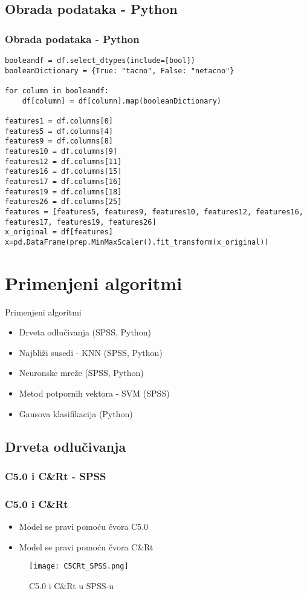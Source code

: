 \documentclass{beamer}
\begin{document}
\subsection*{Obrada podataka - Python}
\begin{frame}[fragile]
\frametitle{Obrada podataka - Python}
\begin{lstlisting}
booleandf = df.select_dtypes(include=[bool])
booleanDictionary = {True: "tacno", False: "netacno"}

for column in booleandf:
    df[column] = df[column].map(booleanDictionary)

features1 = df.columns[0]
features5 = df.columns[4]
features9 = df.columns[8]
features10 = df.columns[9]
features12 = df.columns[11]
features16 = df.columns[15]
features17 = df.columns[16]
features19 = df.columns[18]
features26 = df.columns[25]
features = [features5, features9, features10, features12, features16, features17, features19, features26]
x_original = df[features]
x=pd.DataFrame(prep.MinMaxScaler().fit_transform(x_original))
\end{lstlisting}
\end{frame}

\section{Primenjeni algoritmi}
\begin{frame}{Primenjeni algoritmi}
\begin{itemize}
	\item Drveta odlučivanja (SPSS, Python)
	\item Najbliži susedi - KNN (SPSS, Python)
	\item Neuronske mreže (SPSS, Python)
	\item Metod potpornih vektora - SVM (SPSS)
	\item Gausova klasifikacija (Python)
\end{itemize}
\end{frame}


\subsection{Drveta odlučivanja}
\subsubsection*{C5.0 i C\&Rt - SPSS}
\begin{frame}[fragile]
\frametitle{C5.0 i C\&Rt}
\begin{itemize}
 \item Model se pravi pomoću čvora C5.0
 \item Model se pravi pomoću čvora C\&Rt
\end{itemize}
\begin{figure}
\begin{center}
\texttt{[image: C5CRt\_SPSS.png]}
\end{center}
\caption{C5.0 i C\&Rt u  SPSS-u}
\end{figure}
\end{frame}
\end{document}
